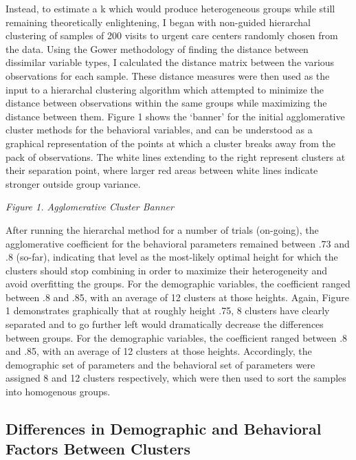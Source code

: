 \documentclass[12pt,twoside]{reedthesis}
\begin{document}
  Instead, to estimate a k which would produce heterogeneous groups while
  still remaining theoretically enlightening, I began with non-guided
  hierarchal clustering of samples of 200 visits to urgent care centers
  randomly chosen from the data. Using the Gower methodology of finding
  the distance between dissimilar variable types, I calculated the
  distance matrix between the various observations for each sample. These
  distance measures were then used as the input to a hierarchal clustering
  algorithm which attempted to minimize the distance between observations
  within the same groups while maximizing the distance between them.
  Figure 1 shows the `banner' for the initial agglomerative cluster
  methods for the behavioral variables, and can be understood as a
  graphical representation of the points at which a cluster breaks away
  from the pack of observations. The white lines extending to the right
  represent clusters at their separation point, where larger red areas
  between white lines indicate stronger outside group variance.
  
  \emph{Figure 1. Agglomerative Cluster Banner}
  
  After running the hierarchal method for a number of trials (on-going),
  the agglomerative coefficient for the behavioral parameters remained
  between .73 and .8 (so-far), indicating that level as the most-likely
  optimal height for which the clusters should stop combining in order to
  maximize their heterogeneity and avoid overfitting the groups. For the
  demographic variables, the coefficient ranged between .8 and .85, with
  an average of 12 clusters at those heights. Again, Figure 1 demonstrates
  graphically that at roughly height .75, 8 clusters have clearly
  separated and to go further left would dramatically decrease the
  differences between groups. For the demographic variables, the
  coefficient ranged between .8 and .85, with an average of 12 clusters at
  those heights. Accordingly, the demographic set of parameters and the
  behavioral set of parameters were assigned 8 and 12 clusters
  respectively, which were then used to sort the samples into homogenous
  groups.
  
  \subsection{Differences in Demographic and Behavioral Factors Between
  Clusters}\label{differences-in-demographic-and-behavioral-factors-between-clusters-1}
  
\end{document}
